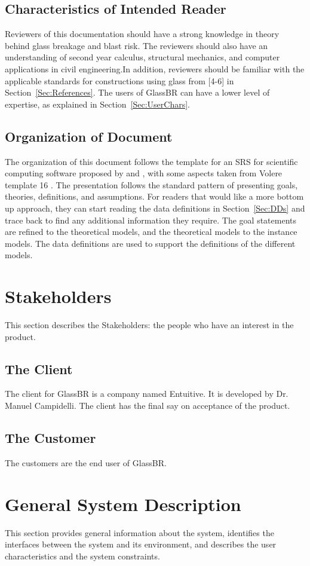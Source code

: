 \documentclass[12pt]{article}
\begin{document}
\subsection{Characteristics of Intended Reader}
\label{Sec:ReaderChars}
Reviewers of this documentation should have a strong knowledge in theory behind glass breakage and blast risk. The reviewers should also have an understanding of second year calculus, structural mechanics, and computer applications in civil engineering.In addition, reviewers should be familiar with the applicable standards for constructions using glass from {[}4-6{]} in Section~\ref{Sec:References}. The users of GlassBR can have a lower level of expertise, as explained in Section~\ref{Sec:UserChars}.
\subsection{Organization of Document}
\label{Sec:DocOrg}
The organization of this document follows the template for an SRS for scientific computing software proposed by \cite{koothoor2013} and \cite{smithLai2005}, with some aspects taken from Volere template 16 \cite{rbrtsn2012}. The presentation follows the standard pattern of presenting goals, theories, definitions, and assumptions. For readers that would like a more bottom up approach, they can start reading the data definitions in Section~\ref{Sec:DDs} and trace back to find any additional information they require.
The goal statements are refined to the theoretical models, and the theoretical models to the instance models. The data definitions are used to support the definitions of the different models.
\section{Stakeholders}
\label{Sec:Stakeholder}
This section describes the Stakeholders: the people who have an interest in the product.
\subsection{The Client}
\label{Sec:Client}
The client for GlassBR is a company named Entuitive. It is developed by Dr. Manuel Campidelli. The client has the final say on acceptance of the product.
\subsection{The Customer}
\label{Sec:Customer}
The customers are the end user of GlassBR.
\section{General System Description}
\label{Sec:GenSysDesc}
This section provides general information about the system, identifies the interfaces between the system and its environment, and describes the user characteristics and the system constraints.
\end{document}

